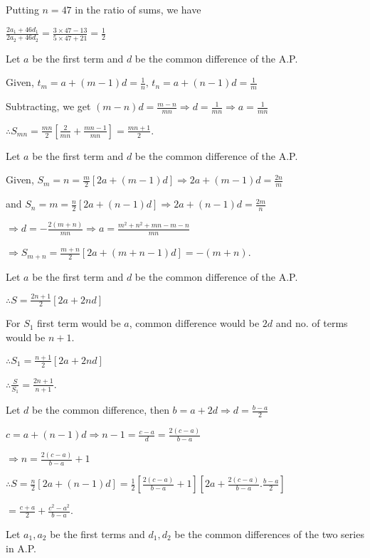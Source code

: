   Putting $n = 47$ in the ratio of sums, we have

  $\frac{2a_1 + 46d_1}{2a_2 + 46d_2} = \frac{3\times 47 - 13}{5\times47 + 21} = \frac{1}{2}$
\item Let $a$ be the first term and $d$ be the common difference of the A.P.

  Given, $t_m = a + (m - 1)d = \frac{1}{n},\,t_n = a + (n - 1)d = \frac{1}{m}$

  Subtracting, we get $(m - n)d = \frac{m - n}{mn} \Rightarrow d = \frac{1}{mn} \Rightarrow a = \frac{1}{mn}$

  $\therefore S_{mn} = \frac{mn}{2}\left[\frac{2}{mn} + \frac{mn - 1}{mn}\right] = \frac{mn + 1}{2}$.
\item Let $a$ be the first term and $d$ be the common difference of the A.P.

  Given, $S_m = n = \frac{m}{2}[2a + (m - 1)d] \Rightarrow 2a + (m - 1)d = \frac{2n}{m}$

  and $S_n = m = \frac{n}{2}[2a + (n - 1)d] \Rightarrow 2a + (n - 1)d = \frac{2m}{n}$

  $\Rightarrow d = -\frac{2(m + n)}{mn}\Rightarrow a = \frac{m^2 + n^2 + mn - m - n}{mn}$

  $\Rightarrow S_{m + n} = \frac{m + n}{2}[2a + (m + n - 1)d] = -(m + n)$.
\item Let $a$ be the first term and $d$ be the common difference of the A.P.

  $\therefore S = \frac{2n + 1}{2}[2a + 2nd]$

  For $S_1$ first term would be $a$, common difference would be $2d$ and no. of terms would be $n + 1$.

  $\therefore S_1 = \frac{n + 1}{2}[2a + 2nd]$

  $\therefore \frac{S}{S_1} = \frac{2n + 1}{n +1}$.
\item Let $d$ be the common difference, then $b = a + 2d \Rightarrow d = \frac{b - a}{2}$

  $c = a + (n - 1)d \Rightarrow n - 1 = \frac{c - a}{d} = \frac{2(c - a)}{b - a}$

  $\Rightarrow n = \frac{2(c - a)}{b - a} + 1$

  $\therefore S = \frac{n}{2}[2a + (n - 1)d] = \frac{1}{2}\left[\frac{2(c - a)}{b - a} + 1\right]\left[2a + \frac{2(c - a)}{b -
    a}.\frac{b - a}{2}\right]$

  $= \frac{c + a}{2} + \frac{c^2 - a^2}{b - a}$.
\item Let $a_1, a_2$ be the first terms and $d_1, d_2$ be the common differences of the two series in A.P.


